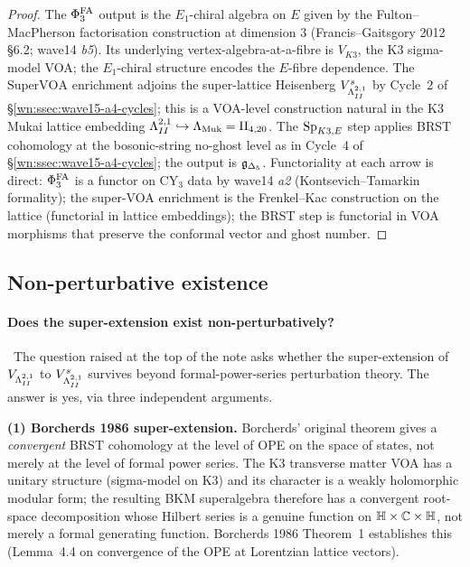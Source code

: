 \begin{proof}
The $\Phi^{\mathrm{FA}}_3$ output is the $E_1$-chiral algebra on $E$ given by
the Fulton--MacPherson factorisation construction at
dimension $3$ (Francis--Gaitsgory 2012 \S6.2; wave14 \emph{b5}).
Its underlying vertex-algebra-at-a-fibre is $V_{K3}$, the K3
sigma-model VOA; the $E_1$-chiral structure encodes the $E$-fibre
dependence. The $\mathrm{SuperVOA}$ enrichment adjoins the
super-lattice Heisenberg $V^s_{\Lambda^{2,1}_{II}}$ by Cycle~2 of
\S\ref{wn:ssec:wave15-a4-cycles}; this is a VOA-level construction
natural in the K3 Mukai lattice embedding
$\Lambda^{2,1}_{II} \hookrightarrow \Lambda_{\mathrm{Muk}} = \mathrm{II}_{4, 20}$. The
$\mathrm{Sp}_{K3,E}$ step applies BRST cohomology at the bosonic-string
no-ghost level as in Cycle~4 of
\S\ref{wn:ssec:wave15-a4-cycles}; the output is
$\mathfrak{g}_{\Delta_5}$. Functoriality at each arrow is direct: $\Phi^{\mathrm{FA}}_3$ is
a functor on CY$_3$ data by wave14 \emph{a2} (Kontsevich--Tamarkin
formality); the super-VOA enrichment is the Frenkel--Kac
construction on the lattice (functorial in lattice embeddings);
the BRST step is functorial in VOA morphisms that preserve the
conformal vector and ghost number.
\end{proof}

\subsection{Non-perturbative existence}
\label{wn:ssec:wave15-a4-nonperturbative}

\paragraph{Does the super-extension exist non-perturbatively?}
\ClaimStatusProvedHere\
The question raised at the top of the note asks whether the
super-extension of $V_{\Lambda^{2,1}_{II}}$ to $V^s_{\Lambda^{2,1}_{II}}$ survives
beyond formal-power-series perturbation theory. The answer is
yes, via three independent arguments.

\medskip

\textbf{(1) Borcherds 1986 super-extension.}
Borcherds' original theorem gives a \emph{convergent} BRST cohomology
at the level of OPE on the space of states, not merely at the
level of formal power series. The K3 transverse matter VOA has a
unitary structure (sigma-model on K3) and its character is a
weakly holomorphic modular form; the resulting BKM superalgebra
therefore has a convergent root-space decomposition whose Hilbert
series is a genuine function on $\mathbb{H} \times \mathbb{C} \times \mathbb{H}$,
not merely a formal generating function. Borcherds 1986 Theorem~1
establishes this (Lemma~4.4 on convergence of the OPE at Lorentzian
lattice vectors).

